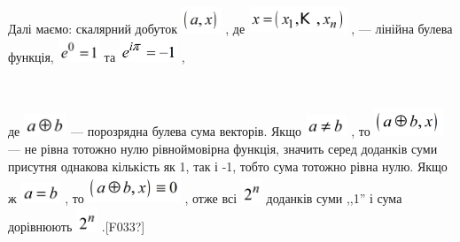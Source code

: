 {{{{{{{{{{{{{{{{Далі маємо: скалярний добуток 
\includegraphics[width=0.4681in,height=0.3055in]{crypt-img/crypt-img138.png} ,
де 
\includegraphics[width=1.1535in,height=0.3075in]{crypt-img/crypt-img139.png} ,
--- лінійна булева функція,  
\includegraphics[width=0.4953in,height=0.2862in]{crypt-img/crypt-img140.png} 
та 
\includegraphics[width=0.6811in,height=0.2917in]{crypt-img/crypt-img141.png} ,

$$

де  \includegraphics[width=0.5043in,height=0.2634in]{crypt-img/crypt-img143.png}
 --- порозрядна булева сума векторів. Якщо 
\includegraphics[width=0.4898in,height=0.25in]{crypt-img/crypt-img144.png} , то
 \includegraphics[width=0.8126in,height=0.3335in]{crypt-img/crypt-img145.png} 
--- не рівна тотожно нулю рівноймовірна функція, значить серед доданків суми
присутня однакова кількість як 1, так і -1, тобто сума тотожно рівна нулю. Якщо
ж  \includegraphics[width=0.472in,height=0.2508in]{crypt-img/crypt-img146.png}
, то 
\includegraphics[width=1.0866in,height=0.3307in]{crypt-img/crypt-img147.png} , 
отже всі 
\includegraphics[width=0.2516in,height=0.2917in]{crypt-img/crypt-img148.png}
доданків  суми ,,1''  і сума дорівнюють 
\includegraphics[width=0.2516in,height=0.2957in]{crypt-img/crypt-img149.png}
.\textlatin{[F033?]}

}}}}}}}}}}}}}}}}
